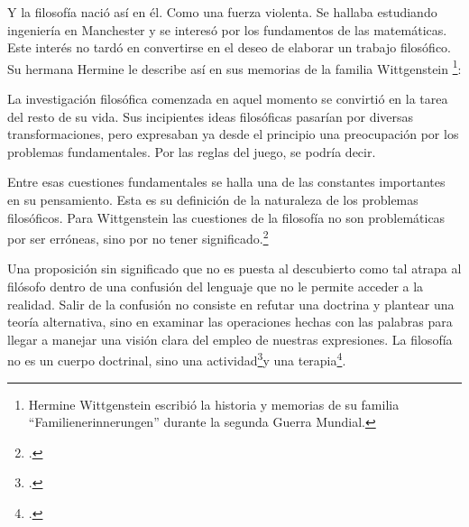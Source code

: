 Y la filosofía nació así en él. Como una fuerza violenta. Se hallaba estudiando
ingeniería en Manchester y se interesó por los fundamentos de las matemáticas.
Este interés no tardó en convertirse en el deseo de elaborar un trabajo
filosófico. Su hermana Hermine le describe así en sus memorias de la familia
Wittgenstein
\footnote{Hermine Wittgenstein escribió la historia y memorias de su familia
  ``Familienerinnerungen'' durante la segunda Guerra Mundial.}:

La investigación filosófica comenzada en aquel momento se convirtió en la
tarea del resto de su vida. Sus incipientes ideas filosóficas pasarían por
diversas transformaciones, pero expresaban ya desde el principio una
preocupación por los problemas fundamentales. Por las reglas del juego, se
podría decir.


Entre esas cuestiones fundamentales se halla una de las constantes importantes
en su pensamiento. Esta es su definición de la naturaleza de los problemas
filosóficos. Para Wittgenstein las cuestiones de la filosofía no son
problemáticas por ser erróneas, sino por no tener
significado.\footcite[cf.~][4.003]{tractatus} 

Una proposición sin significado que no es puesta al descubierto como tal
atrapa al filósofo dentro de una confusión del lenguaje que no le permite
acceder a la realidad. Salir de la confusión no consiste en refutar una
doctrina y plantear una teoría alternativa, sino en examinar las operaciones
hechas con las palabras para llegar a manejar una visión clara del empleo de
nuestras expresiones. La filosofía no es un cuerpo doctrinal, sino una
actividad\footcite[cf.~][4.112]{tractatus}y una
terapia\footcite[cf.~][\S133]{PI}.

